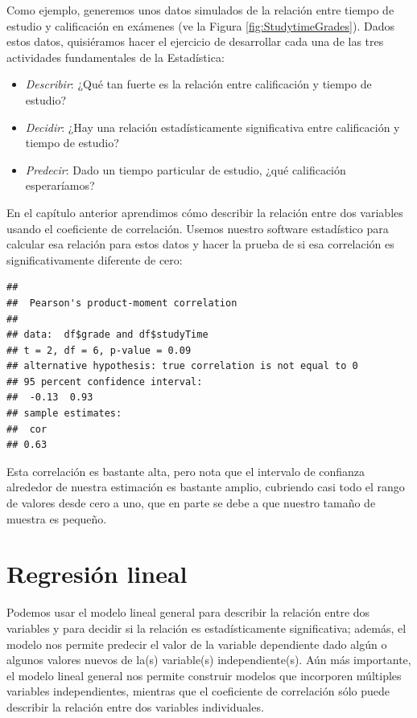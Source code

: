 \documentclass[
  12pt,
]{book}
\providecommand{\tightlist}{%
  \setlength{\itemsep}{0pt}\setlength{\parskip}{0pt}}
\begin{document}
Como ejemplo, generemos unos datos simulados de la relación entre tiempo de estudio y calificación en exámenes (ve la Figura \ref{fig:StudytimeGrades}). Dados estos datos, quisiéramos hacer el ejercicio de desarrollar cada una de las tres actividades fundamentales de la Estadística:

\begin{itemize}
\tightlist
\item
  \emph{Describir}: ¿Qué tan fuerte es la relación entre calificación y tiempo de estudio?
\item
  \emph{Decidir}: ¿Hay una relación estadísticamente significativa entre calificación y tiempo de estudio?
\item
  \emph{Predecir}: Dado un tiempo particular de estudio, ¿qué calificación esperaríamos?
\end{itemize}

En el capítulo anterior aprendimos cómo describir la relación entre dos variables usando el coeficiente de correlación. Usemos nuestro software estadístico para calcular esa relación para estos datos y hacer la prueba de si esa correlación es significativamente diferente de cero:

\begin{verbatim}
## 
##  Pearson's product-moment correlation
## 
## data:  df$grade and df$studyTime
## t = 2, df = 6, p-value = 0.09
## alternative hypothesis: true correlation is not equal to 0
## 95 percent confidence interval:
##  -0.13  0.93
## sample estimates:
##  cor 
## 0.63
\end{verbatim}

Esta correlación es bastante alta, pero nota que el intervalo de confianza alrededor de nuestra estimación es bastante amplio, cubriendo casi todo el rango de valores desde cero a uno, que en parte se debe a que nuestro tamaño de muestra es pequeño.

\hypertarget{linear-regression}{%
\section{Regresión lineal}\label{linear-regression}}

Podemos usar el modelo lineal general para describir la relación entre dos variables y para decidir si la relación es estadísticamente significativa; además, el modelo nos permite predecir el valor de la variable dependiente dado algún o algunos valores nuevos de la(s) variable(s) independiente(s). Aún más importante, el modelo lineal general nos permite construir modelos que incorporen múltiples variables independientes, mientras que el coeficiente de correlación sólo puede describir la relación entre dos variables individuales.
\end{document}
